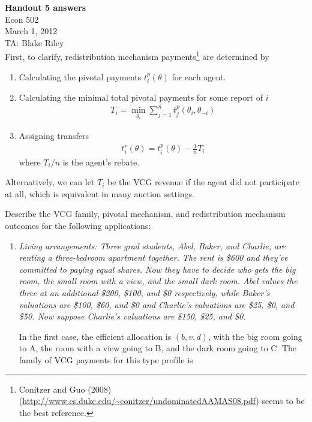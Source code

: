 \documentclass[letter, 10pt]{article}
\theoremstyle{definition}
\begin{document}
\begin{spacing}{1.1}

\noindent
\textbf{Handout 5 answers} \\
Econ 502 \\
March 1, 2012 \\
TA: Blake Riley \\

\noindent
First, to clarify, redistribution mechanism payments\footnote{Conitzer and
  Guo (2008)
  (\url{http://www.cs.duke.edu/~conitzer/undominatedAAMAS08.pdf}) seems to
  be the best reference.} are determined by
  \begin{enumerate}
  \item Calculating the pivotal payments $t_i^p(\theta)$ for each agent.
  \item Calculating the minimal total pivotal payments for some report of
    $i$
    \begin{align*}
      T_i = \min_{\theta_i} \sum_{j=1}^n t_j^p(\theta_i, \theta_{-i})
    \end{align*}
  \item Assigning transfers
    \begin{align*}
      t_i^r(\theta) = t_i^p(\theta) - \frac{1}{n} T_i
    \end{align*}
    where $T_i/n$ is the agent's rebate.
  \end{enumerate}
  Alternatively, we can let $T_i$ be the VCG revenue if the agent did not
  participate at all, which is equivalent in many auction settings.

\vspace{1em}
\noindent
  Describe the VCG family, pivotal mechanism, and redistribution mechanism
outcomes for the following applications:
  \begin{enumerate}
  \item \textit{Living arrangements: Three grad students, Abel, Baker, and
      Charlie, are renting a three-bedroom apartment together. The rent is
      \$600 and they've committed to paying equal shares. Now they have to
      decide who gets the big room, the small room with a view, and the
      small dark room. Abel values the three at an additional \$200,
      \$100, and \$0 respectively, while Baker's valuations are \$100,
      \$60, and \$0 and Charlie's valuations are \$25, \$0, and \$50. Now
      suppose Charlie's valuations are \$150, \$25, and \$0.}

  In the first case, the efficient allocation is $(b, v, d)$, with the big
  room going to A, the room with a view going to B, and the dark room
  going to C. The family of VCG payments for this type profile is


\end{enumerate}
\end{spacing}
\end{document}
